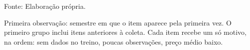 \begin{table}[H]
\caption{Seleção dos Itens por Primeira Observação — CS:GO}\label{tab:selection} 

\fontsize{12.0pt}{14.4pt}\selectfont

\par\vspace{\belowcaptionskip}\footnotesize Fonte: Elaboração própria.\par
\begin{minipage}{\linewidth}
Primeira observação: semestre em que o item aparece pela primeira vez. O primeiro grupo inclui itens anteriores à coleta. Cada item recebe um só motivo, na ordem: sem dados no treino, poucas observações, preço médio baixo.\\
\end{minipage}
\end{table}
